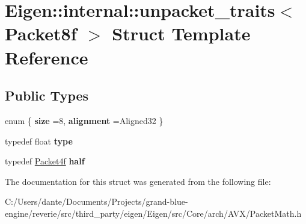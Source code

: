 \hypertarget{struct_eigen_1_1internal_1_1unpacket__traits_3_01_packet8f_01_4}{}\section{Eigen\+::internal\+::unpacket\+\_\+traits$<$ Packet8f $>$ Struct Template Reference}
\label{struct_eigen_1_1internal_1_1unpacket__traits_3_01_packet8f_01_4}
\subsection*{Public Types}
\begin{DoxyCompactItemize}
\item 
\mbox{\label{struct_eigen_1_1internal_1_1unpacket__traits_3_01_packet8f_01_4_aafbfe10800958389e8ae87a2c595c50e}} 
enum \{ {\bfseries size} =8, 
{\bfseries alignment} =Aligned32
 \}
\item 
\mbox{\label{struct_eigen_1_1internal_1_1unpacket__traits_3_01_packet8f_01_4_a8a3bb88f05ceb7126a3e15104d27932a}} 
typedef float {\bfseries type}
\item 
\mbox{\label{struct_eigen_1_1internal_1_1unpacket__traits_3_01_packet8f_01_4_a244e650cd5a4262422abafbfa4221945}} 
typedef \mbox{\hyperlink{struct_eigen_1_1internal_1_1_packet4f}{Packet4f}} {\bfseries half}
\end{DoxyCompactItemize}


The documentation for this struct was generated from the following file\+:\begin{DoxyCompactItemize}
\item 
C\+:/\+Users/dante/\+Documents/\+Projects/grand-\/blue-\/engine/reverie/src/third\+\_\+party/eigen/\+Eigen/src/\+Core/arch/\+A\+V\+X/Packet\+Math.\+h\end{DoxyCompactItemize}
